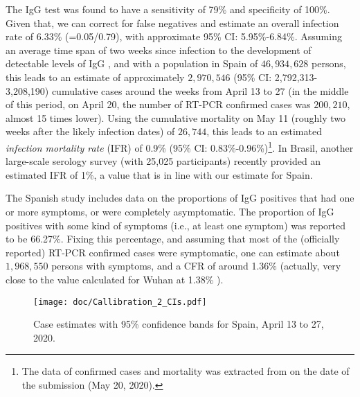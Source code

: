 \documentclass[sigconf]{acmart}
\newcommand{\af}[1]{{#1}}
\newcommand{\cb}[1]{{#1}}
\newcommand{\hh}[1]{{#1}}
\begin{document}
The IgG test was found to have a sensitivity of 79\% and specificity of 100\%. Given that, we can correct for false negatives and estimate an overall infection rate of 6.33\% (=0.05/0.79), \hh{with approximate 95\% CI: 5.95\%-6.84\%}. Assuming an average time span of two weeks since infection to the development of detectable levels of IgG \cite{long2020antibody}, and with a population in Spain of $46,934,628$ persons, this leads to an estimate of approximately $2,970,546$ \hh{(95\% CI: 2,792,313-3,208,190)} cumulative cases around the weeks from April 13 to 27 (in the middle of this period, on April 20, the number of RT-PCR confirmed cases was $200,210$, almost 15 times lower). Using the cumulative mortality on May 11 (roughly two weeks after the likely infection dates) of $26,744$, this leads to an estimated \emph{infection mortality rate} (IFR) of 0.9\% \hh{(95\% CI: 0.83\%-0.96\%)}\footnote{\hh{The data of confirmed cases and mortality was extracted from \cite{ECDC} on the date of the submission (May 20, 2020).}}. \cb{In Brasil, another large-scale serology survey (with 25,025 participants) \cite{Hallal2020.05.30.20117531} recently provided an estimated IFR of 1\%, a value that is in line with our estimate for Spain.}



The Spanish study includes data on the proportions of IgG positives that had one or more symptoms, or were completely asymptomatic. The proportion of IgG positives with some kind of symptoms (i.e., at least one symptom) \hh{was reported to be 66.27\%. Fixing this percentage, and assuming that most of the (officially reported) RT-PCR confirmed cases were symptomatic}, one can estimate about $1,968,550$ persons with symptoms, and a CFR of around 1.36\% (actually, very close to the value calculated for Wuhan at 1.38\% \cite{Verity2020}).


\begin{figure}[htb]
\begin{center}
\texttt{[image: doc/Callibration\_2\_CIs.pdf]}
\end{center}
\caption{\hh{Case estimates with 95\% confidence bands for Spain, April 13 to 27, 2020.}}
\label{cal}
\end{figure}
\end{document}
